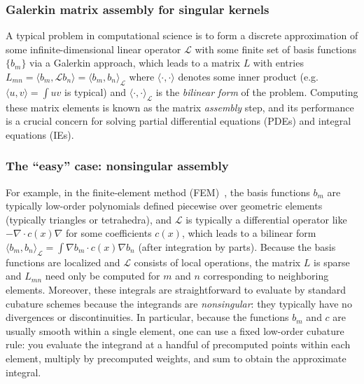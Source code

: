 \subsubsection{Galerkin matrix assembly for singular kernels}

A typical problem in computational science is to form a discrete approximation
of some infinite-dimensional linear operator $\mathcal{L}$ with some finite set of
basis functions $\{ b_m \}$ via a Galerkin approach\cite{Boyd01,Bonnet99,Zienkiewicz13}, which leads to a
matrix $L$ with entries
$L_{mn} = \langle b_m, \mathcal{L} b_n \rangle = \langle b_m, b_n \rangle_\mathcal{L}$
where $\langle \cdot, \cdot \rangle$ denotes some inner product
(e.g.\ $\langle u, v \rangle = \int u v$ is typical) and
$\langle \cdot, \cdot \rangle_\mathcal{L}$ is the \emph{bilinear form} of the problem.
Computing these matrix elements is known as the matrix \emph{assembly} step, and its
performance is a crucial concern for solving partial differential equations (PDEs) and
integral equations (IEs).

\iffalse
\subsubsection{The ``easy'' case: nonsingular assembly}

For example, in the finite-element method (FEM)~\cite{Zienkiewicz13}, the basis functions $b_m$
are typically low-order polynomials defined piecewise over geometric elements
(typically triangles or tetrahedra), and $\mathcal{L}$ is typically a differential
operator like $-\nabla \cdot c(x) \nabla$ for some coefficients $c(x)$, which leads to
a bilinear form
$\langle b_m, b_n \rangle_\mathcal{L} = \int \nabla b_m \cdot c(x) \nabla b_n$
(after integration by parts).
Because the basis functions are localized and $\mathcal{L}$ consists of local operations,
the matrix $L$ is sparse and $L_{mn}$ need only be computed for $m$ and $n$ corresponding
to neighboring elements.
Moreover, these integrals are straightforward to evaluate by standard cubature schemes
because the integrands are \emph{nonsingular}: they typically have no divergences or
discontinuities.
In particular, because the functions $b_m$ and $c$ are usually smooth within a single
element, one can use a fixed low-order cubature rule: you evaluate the integrand at a
handful of precomputed points within each element, multiply by precomputed weights, and
sum to obtain the approximate integral.


